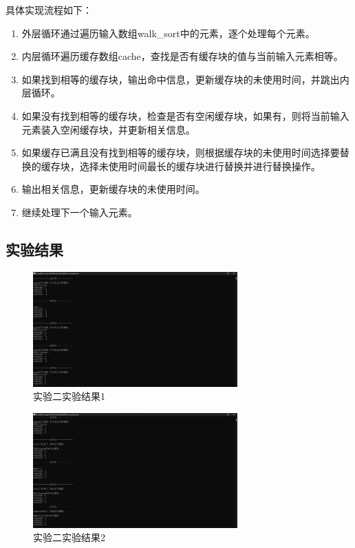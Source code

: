 \documentclass[UTF8,12pt]{article}
\begin{document}
具体实现流程如下：
\begin{enumerate}
    \item 外层循环通过遍历输入数组walk\_sort中的元素，逐个处理每个元素。
    \item 内层循环遍历缓存数组cache，查找是否有缓存块的值与当前输入元素相等。
    \item 如果找到相等的缓存块，输出命中信息，更新缓存块的未使用时间，并跳出内层循环。
    \item 如果没有找到相等的缓存块，检查是否有空闲缓存块，如果有，则将当前输入元素装入空闲缓存块，并更新相关信息。
    \item 如果缓存已满且没有找到相等的缓存块，则根据缓存块的未使用时间选择要替换的缓存块，选择未使用时间最长的缓存块进行替换并进行替换操作。
    \item 输出相关信息，更新缓存块的未使用时间。
    \item 继续处理下一个输入元素。
\end{enumerate}

\newpage

\subsection{实验结果}
\begin{figure}[htbp]
    \centering
    \includegraphics[width=0.7\textwidth]{imgs/3.png}
    \caption{实验二实验结果1}
\end{figure}

\begin{figure}[htbp]
    \centering
    \includegraphics[width=0.7\textwidth]{imgs/4.png}
    \caption{实验二实验结果2}
\end{figure}
\end{document}
